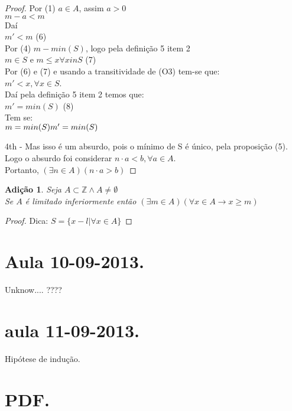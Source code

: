 \documentclass[a4paper,12pt]{article}
\newtheorem{add_int}{Adição}
\begin{document}
\begin{proof}
  Por (1) $a \in A$, assim $a > 0$\\
  $m - a < m$\\
  Daí\\
  $m' < m$ (6)\\

  Por (4) $m - min(S)$, logo pela definição 5 item 2\\
  $m \in S$ e $m\leq x \forall x in S$ (7)\\
  Por (6) e (7) e usando a transitividade de (O3) tem-se que:\\
  $m' < x, \forall x \in S$.\\
  Daí pela definição 5 item 2 temos que:\\
  $m' = min(S)$ (8)\\
  Tem se:\\
  $
  m = min(S)\\
  m' = min (S)
  $

  4th - Mas isso é um absurdo, pois o mínimo de S é único, pela proposição (5). Logo o absurdo foi considerar $n \cdot a < b, \forall a \in A$.\\
  Portanto, $(\exists n \in A)(n \cdot a > b)$
\end{proof}


\begin{add_int} %
  Seja $A \subset \mathbb{Z} \wedge A \neq \emptyset$\\
  Se $A$ é limitado inferiormente então $(\exists m \in A)(\forall x \in A \longrightarrow x \geq m)$
\end{add_int}
\begin{proof}
  Dica: $S = \{x - l | \forall x \in A\}$
\end{proof}

\section{Aula 10-09-2013.}

Unknow.... ????

\section{aula 11-09-2013.}

Hipótese de indução.

\section{PDF.}
\end{document}
